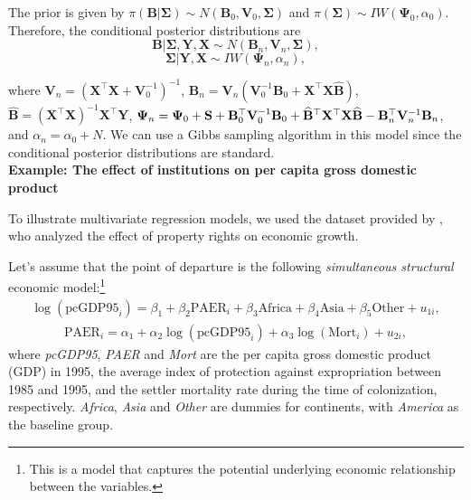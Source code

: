 The prior is given by   $\pi(\bm{B}|\bm{\Sigma})\sim{N}(\bm{B}_0,\bm{V}_0, \bm{\Sigma})$ and $\pi(\bm{\Sigma})\sim{I}{W}(\bm{\Psi}_0,\alpha_0)$. Therefore, the conditional posterior distributions are
\begin{equation*}
	\bm{B}|\bm{\Sigma}, \bm{Y}, \bm{X} \sim{N}(\bm{B}_n, \bm{V}_n, \bm{\Sigma}), 
\end{equation*}
\begin{equation*}
	\bm{\Sigma}| \bm{Y}, \bm{X} \sim {I}{W}(\bm{\Psi}_n, \alpha_n),
\end{equation*}

where $\bm{V}_n=(\bm{X}^{\top}\bm{X}+\bm{V}_0^{-1})^{-1}$, $\bm{B}_n=\bm{V}_n(\bm{V}_0^{-1}\bm{B}_0 + \bm{X}^{\top}\bm{X}\hat{\bm{B}})$, $\hat{\bm{B}}=(\bm{X}^{\top}\bm{X})^{-1}\bm{X}^{\top}\bm{Y}$, $\bm{\Psi}_n = {\bf{\Psi}}_{0}+{\bf{S}}+{\bf{B}}_{0}^{\top}{\bf{V}}_{0}^{-1}{\bf{B}}_{0}+\widehat{\bf{B}}^{\top}{\bf{X}}^{\top}{\bf{X}}\widehat{\bf{B}}-{\bf{B}}_n^{\top}{\bf{V}}_n^{-1}{\bf{B}}_n$, and $\alpha_n = \alpha_0 + N$. We can use a Gibbs sampling algorithm in this model since the conditional posterior distributions are standard.\\

\textbf{Example: The effect of institutions on per capita gross domestic product}

To illustrate multivariate regression models, we used the dataset provided by \cite{Acemoglu2001}, who analyzed the effect of property rights on economic growth.

Let's assume that the point of departure is the following \textit{simultaneous structural} economic model:\footnote{This is a model that captures the potential underlying economic relationship between the variables.}
\begin{align}\label{eq:str1}
	\log(\text{pcGDP95}_i)=\beta_1+\beta_2\text{PAER}_i+\beta_3 \text{Africa}+\beta_4 \text{Asia}+\beta_5 \text{Other}+u_{1i},
\end{align}
\begin{align}\label{eq:str2}
	\text{PAER}_i=\alpha_1+\alpha_2\log(\text{pcGDP95}_i)+\alpha_3\log(\text{Mort}_i)+u_{2i},
\end{align}
where \textit{pcGDP95}, \textit{PAER} and \textit{Mort} are the per capita gross domestic product (GDP) in 1995, the average index of protection against expropriation between 1985 and 1995, and the settler mortality rate during the time of colonization, respectively. \textit{Africa}, \textit{Asia} and \textit{Other} are dummies for continents, with \textit{America} as the baseline group.

